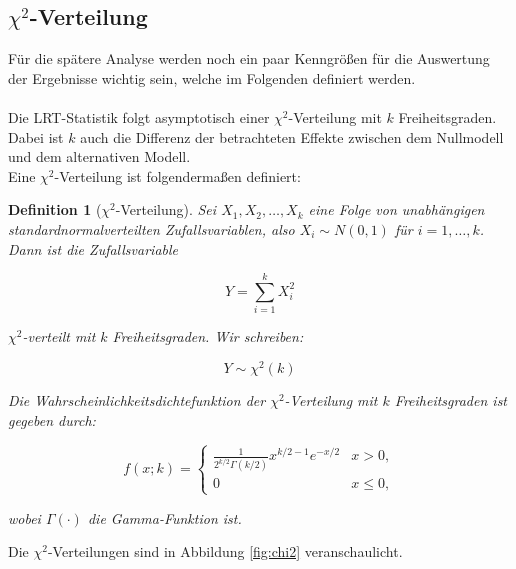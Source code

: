 \documentclass[%
thesis=student,%
coverpage=false,%
titlepage=false,%
headmarks=true, %
german,%
font=libertine, %
math=newpxtx, %
BCOR=5mm,%
coverBCOR=11mm%
]{tumbook}
\theoremstyle{break}
\newtheorem{definition}{Definition}[section]
\begin{document}
\subsection{$\chi^2$-Verteilung}
Für die spätere Analyse werden noch ein paar Kenngrößen für die Auswertung der Ergebnisse wichtig sein, welche im Folgenden definiert werden.\\
\\
Die LRT-Statistik folgt asymptotisch einer $\chi^2$-Verteilung mit $k$ Freiheitsgraden. Dabei ist $k$ auch die Differenz der betrachteten Effekte zwischen dem Nullmodell und dem alternativen Modell. \\
Eine $\chi^2$-Verteilung ist folgendermaßen definiert:
\begin{definition}[$\chi^2$-Verteilung]
	Sei \( X_1, X_2, \ldots, X_k \) eine Folge von unabhängigen standardnormalverteilten Zufallsvariablen, also \( X_i \sim N(0, 1) \) für \( i = 1, \ldots, k \). Dann ist die Zufallsvariable 
	
	\[
	Y = \sum_{i=1}^{k} X_i^2
	\]
	
	$\chi^2$-verteilt mit \( k \) Freiheitsgraden. Wir schreiben:
	
	\[
	Y \sim \chi^2(k)
	\]
	
	Die Wahrscheinlichkeitsdichtefunktion der $\chi^2$-Verteilung mit \( k \) Freiheitsgraden ist gegeben durch:
	
	\[
	f(x; k) = \begin{cases} 
		\frac{1}{2^{k/2} \Gamma(k/2)} x^{k/2 - 1} e^{-x/2} & x > 0, \\
		0 & x \le 0,
	\end{cases}
	\]
	
	wobei \( \Gamma(\cdot) \) die Gamma-Funktion ist.
\end{definition} \noindent
Die $\chi^2$-Verteilungen sind in Abbildung \ref{fig:chi2} veranschaulicht.\\
\end{document}
